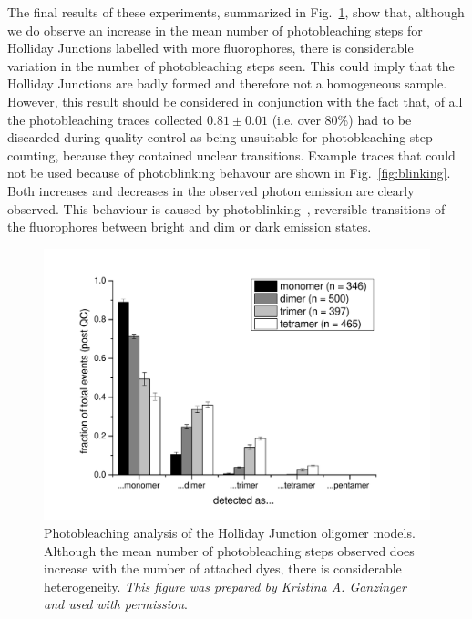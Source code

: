 The final results of these experiments, summarized in Fig.~\ref{fig:photobleaching}, show that, although we do observe an increase in the mean number of photobleaching steps for Holliday Junctions labelled with more fluorophores, there is considerable variation in the number of photobleaching steps seen. This could imply that the Holliday Junctions are badly formed and therefore not a homogeneous sample. However, this result should be considered in conjunction with the fact that, of all the photobleaching traces collected $0.81 \pm 0.01$ (i.e. over 80\%) had to be discarded during quality control as being unsuitable for photobleaching step counting, because they contained unclear transitions. Example traces that could not be used because of photoblinking behavour are shown in Fig.~\ref{fig:blinking}. Both increases and decreases in the observed photon emission are clearly observed. This behaviour is caused by photoblinking~\cite{zondervan03}, reversible transitions of the fluorophores between bright and dim or dark emission states.

\begin{figure}
   \begin{center}
      \includegraphics*[width=5in]{sizing/results-holidayjunctions.pdf}
      \caption{Photobleaching analysis of the Holliday Junction oligomer models. Although the mean number of photobleaching steps observed does increase with the number of attached dyes, there is considerable heterogeneity. \emph{This figure was prepared by Kristina A. Ganzinger and used with permission}.}
      \label{fig:photobleaching}
   \end{center}
\end{figure}

